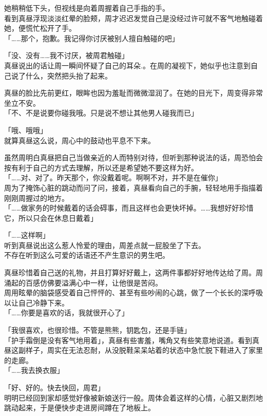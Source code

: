 她稍稍低下头，但视线是向着周握着自己手指的手。\\

看到真昼浮现淡淡红晕的脸颊，周才迟迟发觉自己是没经过许可就不客气地触碰着她，便慌忙松开了手。\\

「……那个，抱歉。我记得你讨厌被别人擅自触碰的吧」

「没、没有……我不讨厌，被周君触碰」\\

真昼说出的话让周一瞬间怀疑了自己的耳朵.。在周的凝视下，她似乎也注意到自己说了什么，突然把头抬了起来。

真昼的脸比先前更红，眼眸也因为羞耻而微微湿润了。在她的目光下，周变得非常坐立不安。\\

「不、不是说要你碰我哦。只是说不想让其他男人碰我而已」

「哦、哦哦」\\

就算真昼这么说，周心中的鼓动也平息不下来。

虽然周明白真昼把自己当做亲近的人而特别对待，但听到那种说法的话，周恐怕会按有利于自己的方式去理解，所以还是希望她不要这样为好。\\

「……对、对了。昨天那个，你没戴着呢。啊啊不对，并不是在催你」\\

周为了掩饰心脏的跳动而问了问，接着，真昼看向自己的手腕，轻轻地用手指描着刚刚周握过的地方。\\

「……做家务的时候戴着的话会碍事，而且这样也会更快坏掉。……我想好好珍惜它，所以只会在休息日戴着」

「……这样啊」\\

听到真昼说出这么惹人怜爱的理由，周差点就一屁股坐了下去。\\

不存在听到这么可爱的话语还不产生意识的男生吧。

真昼珍惜着自己送的礼物，并且打算好好戴上，这两件事都好好地传达给了周。周涌起的百感仿佛要溢满心中一样，让他很是苦闷。\\

周用眩晕的脑袋感受着自己怦怦的、甚至有些吵闹的心跳，做了一个长长的深呼吸以让自己冷静下来。\\

「……你要是喜欢的话，我就很开心了」

「我很喜欢，也很珍惜。不管是熊熊，钥匙包，还是手链」\\

「护手霜倒是没有客气地用着」，真昼有些害羞，嘴角又有些笑意地说道。看到真昼这副样子，周实在无法忍耐，从没脱鞋呆呆站着的状态中急忙脱下鞋进入了家里的走廊。\\

「……我去换衣服」

「好、好的。快去快回，周君」\\

明明已经回到家却感觉好像被新娘送行一般。周体会着这样的心情，心脏又剧烈地跳动起来，于是便快步走进房间蹲在了地板上。

